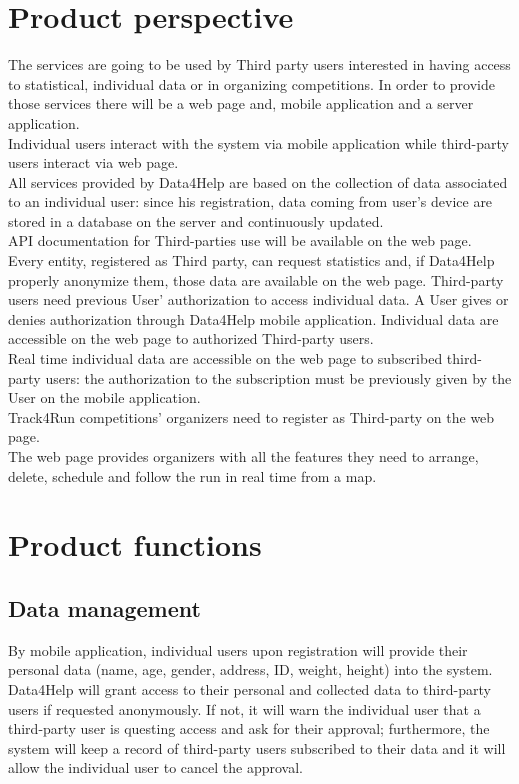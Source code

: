 \section{Product perspective}
The services are going to be used by Third party users interested in having access to statistical, individual data or in organizing competitions. In order to provide those services there will be a web page and, mobile application and a server application.  \\
Individual users interact with the system via mobile application while third-party users interact via web page. \\
All services provided by Data4Help are based on the collection of data associated to an individual user: since his registration, data coming from user’s device are stored in a database on the server and continuously updated. \\
API documentation for Third-parties use will be available on the web page. \\
Every entity, registered as Third party, can request statistics and, if Data4Help properly anonymize them, those data are available on the web page.   
Third-party users need previous User’ authorization to access individual data. A User gives or denies authorization through Data4Help mobile application. Individual data are accessible on the web page to authorized Third-party users.  \\
Real time individual data are accessible on the web page to subscribed third-party users: the authorization to the subscription must be previously given by the User on the mobile application.  \\
Track4Run competitions’ organizers need to register as Third-party on the web page. \\
The web page provides organizers with all the features they need to arrange, delete, schedule and follow the run in real time from a map. 

\section{Product functions}
\subsection{Data management}
By mobile application, individual users upon registration will provide their personal data (name, age, gender, address, ID, weight, height) into the system. Data4Help will grant access to their personal and collected data to third-party users if requested anonymously. If not, it will warn the individual user that a third-party user is questing access and ask for their approval; furthermore, the system will keep a record of third-party users subscribed to their data and it will allow the individual user to cancel the approval.

